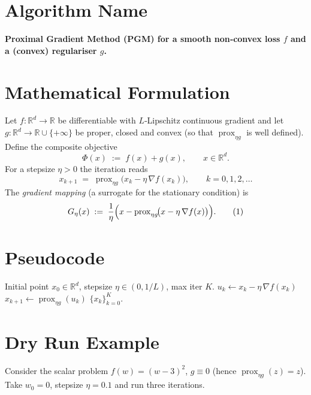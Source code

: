 \documentclass{article}
\newcommand{\prox}{\operatorname{prox}}
\newcommand{\grad}{\nabla}
\newcommand{\R}{\mathbb{R}}
\begin{document}
\section*{Algorithm Name}
\textbf{Proximal Gradient Method (PGM) for a smooth non‑convex loss $f$ and a (convex) regulariser $g$.}

\section*{Mathematical Formulation}
Let $f:\R^{d}\to\R$ be differentiable with $L$‑Lipschitz continuous gradient and let $g:\R^{d}\to\R\cup\{+\infty\}$ be proper, closed and convex (so that $\prox_{\eta g}$ is well defined).  
Define the composite objective
\[
\Phi(x)\;:=\;f(x)+g(x),\qquad x\in\R^{d}.
\]
For a stepsize $\eta>0$ the iteration reads
\begin{equation}
\boxed{\;
x_{k+1}\;=\;\prox_{\eta g}\!\bigl(x_{k}-\eta\,\grad f(x_{k})\bigr),\qquad k=0,1,2,\dots
\;}
\label{eq:update}
\end{equation}
The \emph{gradient mapping} (a surrogate for the stationary condition) is
\[
G_{\eta}(x)\;:=\;\frac{1}{\eta}\Bigl(x-\prox_{\eta g}\!\bigl(x-\eta\,\grad f(x)\bigr)\Bigr).
\tag{1}
\]

\section*{Pseudocode}
\begin{algorithm}[H]
\caption{Proximal Gradient Method}
\begin{algorithmic}[1]
\Require Initial point $x_{0}\in\R^{d}$, stepsize $\eta\in(0,1/L)$, max iter $K$.
    \State $u_{k}\gets x_{k}-\eta\,\grad f(x_{k})$ 
    \State $x_{k+1}\gets \prox_{\eta g}(u_{k})$ 
\EndFor
\State \Return $\{x_{k}\}_{k=0}^{K}$.
\end{algorithmic}
\end{algorithm}

\section*{Dry Run Example}
Consider the scalar problem $f(w)=(w-3)^{2}$, $g\equiv0$ (hence $\prox_{\eta g}(z)=z$).  
Take $w_{0}=0$, stepsize $\eta=0.1$ and run three iterations.
\end{document}
